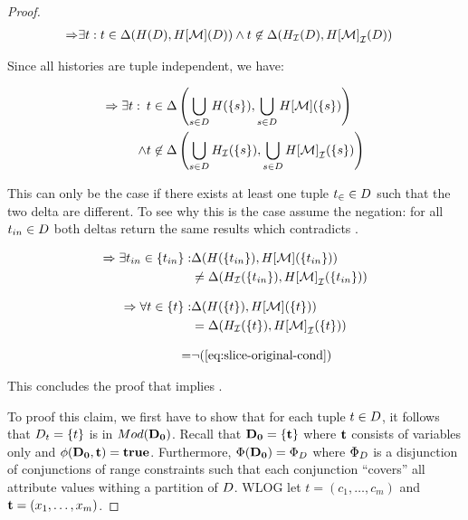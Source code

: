 \begin{proof}
    \begin{align*}
      \Rightarrow &\exists t: t \in \Delta(H(D),H[\mathcal{M}](D)) \land t \not\in \Delta({H}_{\mathcal{I}}(D),{H[\mathcal{M}]}_{\mathcal{I}}(D))
    \end{align*}

Since all histories are tuple independent, we have:

\begin{align}
  \label{eq:delta-TI-has-difference}
      \Rightarrow \exists t:\,\,\, &t \in \Delta\left(\bigcup_{s \in D}H(\{s\}),\bigcup_{s \in D}H[\mathcal{M}](\{s\})\right)\\
                    \land &t \not\in \Delta\left(\bigcup_{s \in D}{H}_{\mathcal{I}}(\{s\}), \bigcup_{s \in D} {H[\mathcal{M}]}_{\mathcal{I}}(\{s\})\right)
    \end{align}

    This can only be the case if there exists at least one tuple $t_{\in} \in D$ such that the two delta are different. To see why this is the case assume the negation: for all $t_{in} \in D$ both deltas return the same results which contradicts .

    \begin{align*}
      \Rightarrow \exists t_{in} \in \{t_{in}\}: &\Delta(H(\{t_{in}\}),H[\mathcal{M}](\{t_{in}\}))\\
      &\neq \Delta({H}_{\mathcal{I}}(\{t_{in}\}),{H[\mathcal{M}]}_{\mathcal{I}}(\{t_{in}\}))\\[3mm]
      \Rightarrow \forall t \in \{t\}: &\Delta(H(\{t\}),H[\mathcal{M}](\{t\}))\\
      &= \Delta({H}_{\mathcal{I}}(\{t\}),{H[\mathcal{M}]}_{\mathcal{I}}(\{t\}))\\[3mm]
           = &\neg (\ref{eq:slice-original-cond})
    \end{align*}

This concludes the proof that  implies .

To proof this claim, we first have to show that for each tuple $t \in D$, it follows that $D_t = \{t \}$ is in $Mod({\mathbf{D_0}})$. Recall that $\mathbf{D_0} = \{\mathbf{t}\}$ where $\mathbf{t}$ consists of variables only and $\phi(\mathbf{D_0},\mathbf{t}) = \mathbf{true}$. Furthermore, $\Phi(\mathbf{D_0}) = \Phi_{D}$ where $\Phi_{D}$ is a disjunction of conjunctions of range constraints such that each conjunction  ``covers'' all attribute values withing a partition of $D$. WLOG let $t = (c_1, \ldots, c_m)$ and $\mathbf{t} = (x_1, \ldots, x_m)$.


\end{proof}
